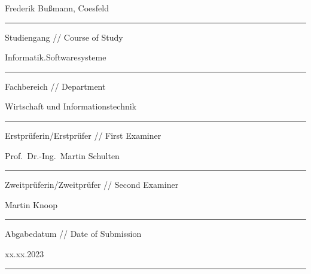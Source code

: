 \begin{titlepage}
        \vskip 0.03cm

        \begingroup
        \fontsize{12pt}{14pt}\selectfont
        Frederik Bußmann, Coesfeld
        \endgroup

        \vskip -0.05cm

        \noindent\rule{14cm}{0.4pt}

        \vskip 0.13cm

        \begingroup
        \fontsize{8pt}{6pt}\selectfont
        Studiengang // Course of Study
        \endgroup

        \vskip 0.03cm

        \begingroup
        \fontsize{12pt}{14pt}\selectfont
        Informatik.Softwaresysteme
        \endgroup

        \vskip -0.05cm

        \noindent\rule{14cm}{0.4pt}

        \vskip 0.13cm

        \begingroup
        \fontsize{8pt}{6pt}\selectfont
        Fachbereich // Department
        \endgroup

        \vskip 0.03cm

        \begingroup
        \fontsize{12pt}{14pt}\selectfont
        Wirtschaft und Informationstechnik
        \endgroup

        \vskip -0.05cm

        \noindent\rule{14cm}{0.4pt}

        \vskip 0.13cm

        \begingroup
        \fontsize{8pt}{6pt}\selectfont
        Erstprüferin/Erstprüfer // First Examiner
        \endgroup

        \vskip 0.03cm

        \begingroup
        \fontsize{12pt}{14pt}\selectfont
        Prof.\ Dr.-Ing.\ Martin Schulten
        \endgroup

        \vskip -0.05cm

        \noindent\rule{14cm}{0.4pt}

        \vskip 0.13cm

        \begingroup
        \fontsize{8pt}{6pt}\selectfont
        Zweitprüferin/Zweitprüfer // Second Examiner
        \endgroup

        \vskip 0.03cm

        \begingroup
        \fontsize{12pt}{14pt}\selectfont
        Martin Knoop
        \endgroup

        \vskip -0.05cm

        \noindent\rule{14cm}{0.4pt}

        \vskip 0.13cm

        \begingroup
        \fontsize{8pt}{6pt}\selectfont
        Abgabedatum // Date of Submission
        \endgroup

        \vskip 0.03cm

        \begingroup
        \fontsize{12pt}{14pt}\selectfont
        xx.xx.2023
        \endgroup

        \vskip -0.05cm

        \noindent\rule{14cm}{0.4pt}
    \restoregeometry
\end{titlepage}
\clearpage
